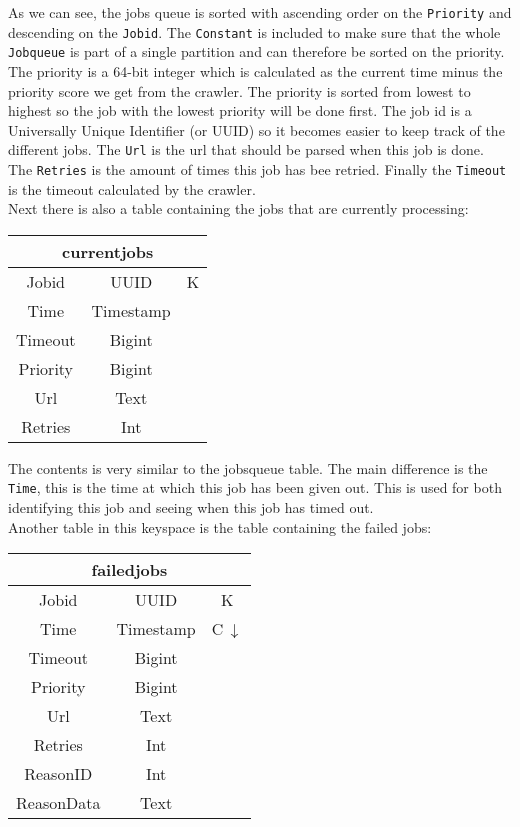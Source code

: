 \documentclass[../Main.tex]{subfiles}
\begin{document}
As we can see, the jobs queue is sorted with ascending order on the \texttt{Priority} and descending on the \texttt{Jobid}. The \texttt{Constant} is included to make sure that the whole \texttt{Jobqueue} is part of a single partition and can therefore be sorted on the priority. The priority is a 64-bit integer which is calculated as the current time minus the priority score we get from the crawler. The priority is sorted from lowest to highest so the job with the lowest priority will be done first. The job id is a Universally Unique Identifier (or UUID) so it becomes easier to keep track of the different jobs. The \texttt{Url} is the url that should be parsed when this job is done. The \texttt{Retries} is the amount of times this job has bee retried. Finally the \texttt{Timeout} is the timeout calculated by the crawler.\\

Next there is also a table containing the jobs that are currently processing:\\
\begin{table}[h]
    \centering
    \begin{tabular}{|ccc|}
\hline
    \multicolumn{3}{|c|}{\textbf{currentjobs}}   \\
    \hline
    Jobid & UUID & K \\
    Time & Timestamp & \\
    Timeout & Bigint & \\
    Priority & Bigint & \\
    Url & Text & \\
    Retries & Int & \\
    \hline
\end{tabular}
\end{table}

The contents is very similar to the jobsqueue table. The main difference is the \texttt{Time}, this is the time at which this job has been given out. This is used for both identifying this job and seeing when this job has timed out.\\

Another table in this keyspace is the table containing the failed jobs:\\
\begin{table}[h]
    \centering
    \begin{tabular}{|ccc|}
\hline
    \multicolumn{3}{|c|}{\textbf{failedjobs}}   \\
    \hline
    Jobid & UUID & K \\
    Time & Timestamp & C\,$\downarrow$ \\
    Timeout & Bigint & \\
    Priority & Bigint & \\
    Url & Text & \\
    Retries & Int & \\
    ReasonID & Int & \\
    ReasonData & Text & \\
    \hline
\end{tabular}
\end{table}
\end{document}
